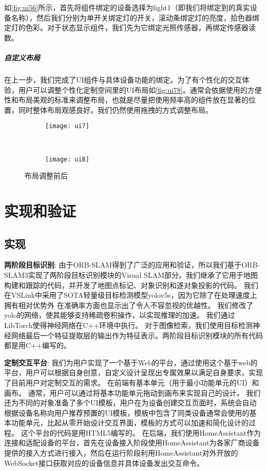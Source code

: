 如\autoref{fig:ui56}所示，首先将组件绑定的设备选择为light1（即我们将绑定到的真实设备名称），然后我们分别为单开关绑定灯的开关，滚动条绑定灯的亮度，拾色器绑定灯的色彩。对于状态显示组件，我们先为它绑定光照传感器，再绑定传感器读数。

\paragraph{自定义布局}
在上一步，我们完成了UI组件与具体设备功能的绑定。为了有个性化的交互体验，用户可以调整个性化定制空间里的UI布局如\autoref{fig:ui78}。通常会依据使用的方便性和布局美观的标准来调整布局，也就是尽量把使用频率高的组件放在显著的位置，同时整体布局观感良好。我们仍然使用拖拽的方式调整布局。

\begin{figure}[htbp]
	\centering
	\begin{subfigure}{.65\linewidth}
		\texttt{[image: ui7]}
		\caption{}
	\end{subfigure}
	\ 
	\begin{subfigure}{.65\linewidth}
		\texttt{[image: ui8]}
		\caption{}
	\end{subfigure}
	\caption{布局调整前后}\label{fig:ui78}
\end{figure}

\chapter{实现和验证}
\label{chap:eval}
\section{实现}
\textbf{两阶段目标识别}: 由于ORB-SLAM得到了广泛的应用和验证，所以我们基于ORB-SLAM3\cite{CamElvRod20}实现了两阶段目标识别模块的Visual SLAM部分。我们继承了它用于地图构建和跟踪的代码，并开发了地图点标记、对象识别和逐对象投影的代码。
我们在VSLink中采用了SOTA轻量级目标检测模型yolov5s\cite{glenn_jocher_2020_4154370}，因为它除了在处理速度上拥有相对优势外 在准确率方面也显示出了令人不容忽视的优越性。
我们修改了yolo的网络，使其能够支持稀疏卷积操作\cite{ren2018sbnet}，以实现推理的加速。
我们通过LibTorch使得神经网络在C++环境中执行。
对于图像检索，我们使用目标检测神经网络最后一个特征提取层的输出\cite{glenn_jocher_2020_4154370}作为特征表示。两阶段目标识别模块的所有代码都是用C++编写的。

\textbf{定制交互平台}: 我们为用户实现了一个基于Web的平台，通过使用这个基于web的平台，用户可以根据自身创意，自定义设计呈现出专属效果以满足自身要求，实现了目前用户对定制交互的需求。
在前端有基本单元（用于最小功能单元的UI）和画布。
通常，用户可以通过将基本功能单元拖动到画布来实现自己的设计。
我们还为不同的对象准备了多个UI模板，用户在为设备创建交互页面时，系统会自动根据设备名称向用户推荐预置的UI模板，模板中包含了同类设备通常会使用的基本功能单元，比起从零开始设计交互界面，模板的方式可以加速和简化设计的过程。
这个平台的代码是用HTML5编写的。
在后端，我们使用HomeAssistant\cite{homeass}作为连接和适配设备的平台，首先在设备接入阶段使用HomeAssistant为各家厂商设备提供的接入方式进行接入，然后在运行阶段利用HomeAssistant对外开放的WebSocket接口获取对应的设备信息并具体设备发出交互命令。
